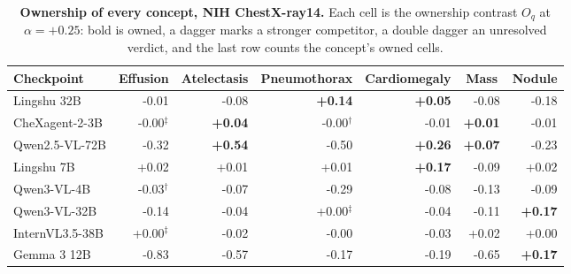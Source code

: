 \begin{table}[htbp]
\centering
\scriptsize
\setlength{\tabcolsep}{4pt}
\caption{\textbf{Ownership of every concept, NIH ChestX-ray14.} Each cell is the ownership contrast $O_q$ at $\alpha=+0.25$: bold is owned, a dagger marks a stronger competitor, a double dagger an unresolved verdict, and the last row counts the concept's owned cells.}
\label{tab:cf-own-nih}
\begin{tabular}{lrrrrrr}
\toprule
Checkpoint & \multicolumn{1}{c}{Effusion} & \multicolumn{1}{c}{Atelectasis} & \multicolumn{1}{c}{Pneumothorax} & \multicolumn{1}{c}{Cardiomegaly} & \multicolumn{1}{c}{Mass} & \multicolumn{1}{c}{Nodule}\\
\midrule
Lingshu 32B & \cellcolor{cfTerra1}-0.01 & \cellcolor{cfTerra2}-0.08 & \cellcolor{cfSlate3}\textbf{+0.14} & \cellcolor{cfSlate2}\textbf{+0.05} & \cellcolor{cfTerra2}-0.08 & \cellcolor{cfTerra3}-0.18 \\
CheXagent-2-3B & \cellcolor{cfTerra1}-0.00$^{\ddagger}$ & \cellcolor{cfSlate2}\textbf{+0.04} & \cellcolor{cfTerra1}-0.00$^{\dagger}$ & \cellcolor{cfTerra1}-0.01 & \cellcolor{cfSlate1}\textbf{+0.01} & \cellcolor{cfTerra1}-0.01 \\
Qwen2.5-VL-72B & \cellcolor{cfTerra4}-0.32 & \cellcolor{cfSlate4}\textbf{+0.54} & \cellcolor{cfTerra4}-0.50 & \cellcolor{cfSlate4}\textbf{+0.26} & \cellcolor{cfSlate2}\textbf{+0.07} & \cellcolor{cfTerra3}-0.23 \\
Lingshu 7B & \cellcolor{cfSlate1}+0.02 & \cellcolor{cfSlate1}+0.01 & \cellcolor{cfSlate1}+0.01 & \cellcolor{cfSlate3}\textbf{+0.17} & \cellcolor{cfTerra2}-0.09 & \cellcolor{cfSlate1}+0.02 \\
Qwen3-VL-4B & \cellcolor{cfTerra2}-0.03$^{\dagger}$ & \cellcolor{cfTerra2}-0.07 & \cellcolor{cfTerra4}-0.29 & \cellcolor{cfTerra2}-0.08 & \cellcolor{cfTerra3}-0.13 & \cellcolor{cfTerra2}-0.09 \\
Qwen3-VL-32B & \cellcolor{cfTerra3}-0.14 & \cellcolor{cfTerra2}-0.04 & \cellcolor{cfSlate1}+0.00$^{\ddagger}$ & \cellcolor{cfTerra2}-0.04 & \cellcolor{cfTerra3}-0.11 & \cellcolor{cfSlate3}\textbf{+0.17} \\
InternVL3.5-38B & \cellcolor{cfSlate1}+0.00$^{\ddagger}$ & \cellcolor{cfTerra1}-0.02 & \cellcolor{cfTerra1}-0.00 & \cellcolor{cfTerra2}-0.03 & \cellcolor{cfSlate1}+0.02 & \cellcolor{cfSlate1}+0.00 \\
Gemma 3 12B & \cellcolor{cfTerra4}-0.83 & \cellcolor{cfTerra4}-0.57 & \cellcolor{cfTerra3}-0.17 & \cellcolor{cfTerra3}-0.19 & \cellcolor{cfTerra4}-0.65 & \cellcolor{cfSlate3}\textbf{+0.17} \\

\end{tabular}
\end{table}

